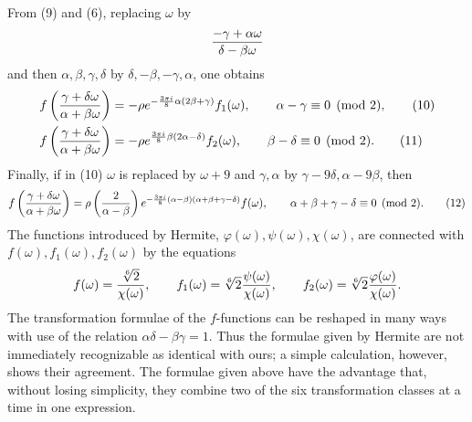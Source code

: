\documentclass[11pt]{article}
\providecommand{\Jac}[2]{\left(\frac{#1}{#2}\right)}
\begin{document}
From (9) and (6), replacing $\omega$ by
\[
{-\gamma+
\alpha\omega\over\delta-
\beta\omega}
\]
and then $\alpha,\beta,\gamma,\delta$ by $\delta,-\beta,-\gamma,\alpha$, one obtains
\begin{align}
f\left({\gamma+
\delta\omega\over\alpha+
\beta\omega}\right)
&=-\rho e^{-\frac{3\pi i}{8}\alpha(2\beta+
\gamma)}f_1(\omega),
\qquad \alpha-
\gamma\equiv0\pmod2, \tag{10}\\
f\left({\gamma+
\delta\omega\over\alpha+
\beta\omega}\right)
&=-\rho e^{\frac{3\pi i}{8}\beta(2\alpha-
\delta)}f_2(\omega),
\qquad \beta-
\delta\equiv0\pmod2. \tag{11}
\end{align}
Finally, if in (10) $\omega$ is replaced by $\omega+9$ and $\gamma,
\alpha$ by $\gamma-9\delta,
\alpha-9\beta$, then
\begin{equation}
f\left({\gamma+
\delta\omega\over\alpha+
\beta\omega}\right)
=\rho\Jac{2}{\alpha-
\beta}e^{-\frac{3\pi i}{8}(\alpha-
\beta)(\alpha+
\beta+
\gamma-
\delta)}f(\omega),
\qquad \alpha+
\beta+
\gamma-
\delta\equiv0\pmod2. 
\tag{12}
\end{equation}
The functions introduced by Hermite, $\varphi(\omega),\psi(\omega),\chi(\omega)$, are connected with $f(\omega),f_1(\omega),f_2(\omega)$ by the equations
\[
f(\omega)={\sqrt[6]{2}\over\chi(\omega)},
\qquad
f_1(\omega)=\sqrt[6]{2}{\psi(\omega)\over\chi(\omega)},
\qquad
f_2(\omega)=\sqrt[6]{2}{\varphi(\omega)\over\chi(\omega)}.
\]
The transformation formulae of the $f$-functions can be reshaped in many ways with use of the relation $\alpha\delta-\beta\gamma=1$. Thus the formulae given by Hermite are not immediately recognizable as identical with ours; a simple calculation, however, shows their agreement. The formulae given above have the advantage that, without losing simplicity, they combine two of the six transformation classes at a time in one expression.
\end{document}
